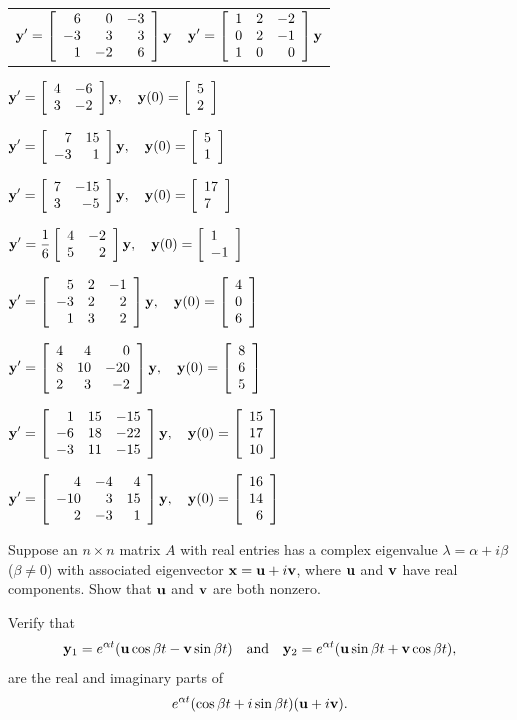 \begin{exerciselist}
  \begin{tabular}[t]{@{}p{168pt}@{}p{168pt}}
    \item\label{exer:10.6.15} $\displaystyle{{\bf y}'=\left[\begin{array}{rrr} 6&0&-3\\-3&3&3\\1&-2&6\end{array}\right]{\bf y}}$ &
    \item\label{exer:10.6.16} $\displaystyle{{\bf y}'=\left[\begin{array}{rrr} 1&2&-2\\0&2&-1\\1&0&0\end{array}\right]{\bf y}}$
  \end{tabular}


  \item\label{exer:10.6.17} $\displaystyle{{\bf y}'=\left[\begin{array}{rr} 4&-6\\3&-2\end{array}\right]{\bf y},\quad{\bf y}(0)=\left[\begin{array}{l}5\\2\end{array}\right]}$

  \item\label{exer:10.6.18} $\displaystyle{{\bf y}'=\left[\begin{array}{rr} 7&15\\-3&1\end{array}\right]{\bf y},\quad{\bf y}(0)=\left[\begin{array}{l}5\\1\end{array}\right]}$

  \item\label{exer:10.6.19}
        $\displaystyle{{\bf y}'=\left[\begin{array}{rr} 7&-15\\3&-5\end{array}\right]{\bf y},\quad{\bf y}(0)=\left[\begin{array}{l}17\\7\end{array}\right]}$

  \item\label{exer:10.6.20}
        $\displaystyle{{\bf y}'=\frac{1}{6}\left[\begin{array}{rr} 4&-2\\5&2\end{array}\right]{\bf y},\quad{\bf y}(0)=\left[\begin{array}{l}1\\-1\end{array}\right]}$

  \item\label{exer:10.6.21}
        $\displaystyle{{\bf y}'=\left[\begin{array}{rrr} 5&2&-1\\-3&2&2\\1&3&2\end{array}\right]{\bf y},\quad{\bf y}(0)=\left[\begin{array}{r}4\\0\\6\end{array}\right]}$

  \item\label{exer:10.6.22}
        $\displaystyle{{\bf y}'=\left[\begin{array}{rrr} 4&4&0\\8&10&-20\\2&3&-2\end{array}\right]{\bf y},\quad{\bf y}(0)=\left[\begin{array}{r}8\\6\\5\end{array}\right]}$

  \item\label{exer:10.6.23}
        $\displaystyle{{\bf y}'=\left[\begin{array}{rrr} 1&15&-15\\-6&18&-22\\-3&11&-15\end{array}\right]{\bf y},\quad{\bf y}(0)=\left[\begin{array}{r}15\\17\\10\end{array}\right]}$

  \item\label{exer:10.6.24}
        $\displaystyle{{\bf y}'=\left[\begin{array}{rrr} 4&-4&4\\-10&3&15\\2&-3&1\end{array}\right]{\bf y},\quad {\bf y}(0)=\left[\begin{array}{r}16\\14\\6\end{array}\right]}$

  \item\label{exer:10.6.25} Suppose an $n\times n$ matrix $A$ with real entries has a complex
        eigenvalue $\lambda=\alpha+i\beta$ ($\beta\ne0$) with associated eigenvector
        ${\bf x}={\bf u}+i{\bf v}$, where ${\bf u}$ and ${\bf v}$ have real components. Show that
        ${\bf u}$ and ${\bf v}$ are both nonzero.

  \item\label{exer:10.6.26} Verify that
  \[
    {\bf y}_{1}=e^{\alpha t}({\bf u}\cos\beta t-{\bf v}\sin\beta t) \mbox{\quad and\quad}{\bf y}_{2}=e^{\alpha t}({\bf u}\sin\beta t+{\bf v}\cos\beta t),
  \]
  are the real and imaginary parts of
  \[
    e^{\alpha t}(\cos\beta t+i\sin\beta t)({\bf u}+i{\bf v}).
  \]


\end{exerciselist}

